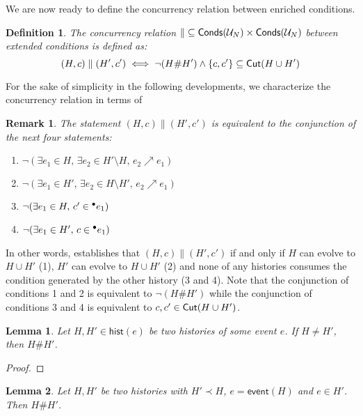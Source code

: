 \documentclass{article}
\newtheorem{definition}{Definition}
\newtheorem{lemma}{Lemma}
\newtheorem{remark}{Remark}
\newcommand{\event}[1]{\ensuremath{\mathsf{event}(#1)}}
\newcommand{\hist}[1]{\ensuremath{\mathsf{hist}(#1)}}
\newcommand{\conds}[1]{\ensuremath{\mathsf{Conds}(#1)}}
\newcommand{\confl}{\ensuremath{\mathord{\#}}}
\begin{document}
We are now ready to define the concurrency relation between enriched
conditions.

\begin{definition}
The \emph{concurrency relation} $\mathord\parallel \subseteq \conds{\unf N} \times
\conds{\unf N}$ between extended conditions is defined as: $$ (H, c) \parallel
(H', c') \iff \lnot (H \confl H') \land \{c, c'\} \subseteq \cut{H \cup H'}$$
\end{definition}

For the sake of simplicity in the following developments, we characterize the
concurrency relation in terms of 

\begin{remark}
\label{rmk:the.statement}
The statement $(H, c) \parallel (H', c')$ is equivalent to the conjunction of
the next four statements:
\begin{enumerate}
\item $\lnot (\exists e_1 \in H,\, \exists e_2 \in H' \setminus H,\, e_2
\nearrow e_1)$
\item $\lnot (\exists e_1 \in H',\, \exists e_2 \in H \setminus H',\, e_2
\nearrow e_1)$
\item $\lnot (\exists e_1 \in H,\, c' \in {}^\bullet e_1)$
\item $\lnot (\exists e_1 \in H',\, c \in {}^\bullet e_1)$
\end{enumerate}
\end{remark}

In other words,  establishes that $(H, c) \parallel (H',
c')$ if and only if $H$ can evolve to $H \cup H'$ (1), $H'$ can evolve to $H
\cup H'$ (2) and none of any histories consumes the condition generated by the
other history (3 and 4).  Note that the conjunction of conditions 1 and 2 is
equivalent to $\lnot (H \confl H')$ while the conjunction of conditions 3 and 4
is equivalent to $c, c' \in \mathsf{Cut }{(H \cup H')}$.

\begin{lemma}
\label{lem:let.H}
Let $H, H' \in \hist{e}$ be two histories of some event $e$.  If $H \not= H'$,
then $H \confl H'$.
\end{lemma}

\begin{proof}
\end{proof}

\begin{lemma}
\label{lem:two.histories}
Let $H, H'$ be two histories with $H' \prec H$, $e = \event{H}$ and $e \in H'$.
Then $H \confl H'$.
\end{lemma}
\end{document}
